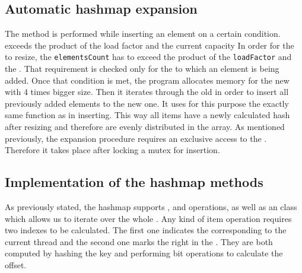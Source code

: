     \subsection{Automatic hashmap expansion}
        The \expandMethod method is performed while inserting an element on a certain condition.
        exceeds the product of the load factor and the current capacity
        In order for the \internalHashMap to resize, the \texttt{elementsCount} has to exceed the product of the \texttt{loadFactor} and the \internalMapsCount.
        That requirement is checked only for the \internalHashMap to which an element is being added. 
        Once that condition is met, the program allocates memory for the new \internalHashMap with 4 times bigger size. 
        Then it iterates through the old \internalHashMap in order to insert all previously added elements to the new one. 
        It uses for this purpose the exactly same function as in inserting. 
        This way all items have a newly calculated hash after resizing and therefore are evenly distributed in the array. 
        As mentioned previously, the expansion procedure requires an exclusive access to the \internalHashMap. Therefore it takes place after locking a mutex for insertion.

    \subsection{Implementation of the hashmap methods}
        As previously stated, the hashmap supports \insertMethod, \getMethod and \removeMethod operations, as well as an \Iterator class which allows us to iterate over the whole \NvmHashMap.
        Any kind of item operation requires two indexes to be calculated. 
        The first one indicates the \internalHashMap corresponding to the current thread and the second one marks the right \Segment in the \internalHashMap. 
        They are both computed by hashing the key and performing bit operations to calculate the offset.
    
